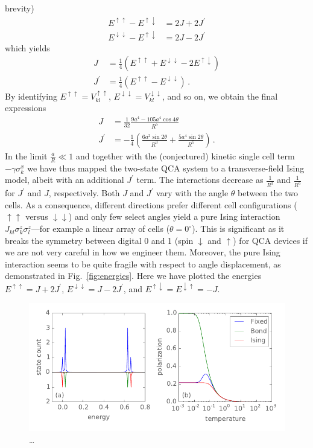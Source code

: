brevity)
%
\begin{align}
  E^{\uparrow\uparrow} - E^{\uparrow\downarrow} &= 2J + 2J^{\prime} \\
  E^{\downarrow\downarrow} - E^{\uparrow\downarrow} &= 2J - 2J^{\prime}
\end{align}
%
which yields
%
\begin{align}
  J &= \frac{1}{4} 
  \left( 
    E^{\uparrow\uparrow} + E^{\downarrow\downarrow} - 2 E^{\uparrow\downarrow} 
  \right) \\
  J^{\prime} &= \frac{1}{4}
  \left( E^{\uparrow\uparrow} - E^{\downarrow\downarrow} \right) \, .
\end{align}
%
By identifying $E^{\uparrow\uparrow} = V^{\uparrow\uparrow}_{kl}$,
$E^{\downarrow\downarrow} = V^{\downarrow\downarrow}_{kl}$, and so on, we obtain
the final expressions
% 
\begin{align}
  J 
  &=
  \frac{1}{32}
  \frac{9 a^4 - 105 a^4 \cos{4\theta}}{R^5} \\
  J^{\prime}
  &=
  - \frac{1}{4}
  \left(
    \frac{6 a^2 \sin{2\theta}}{R^3} + \frac{5 a^4 \sin{2\theta}}{R^5}
  \right) \, .
\end{align}
%
In the limit $\frac{a}{R} \ll 1$ and together with the (conjectured) kinetic
single cell term $-\gamma \sigma^x_k$ we have thus mapped the two-state QCA
system to a transverse-field Ising model, albeit with an additional $J^{\prime}$
term. The interactions decrease as $\frac{1}{R^3}$ and $\frac{1}{R^5}$ for
$J^{\prime}$ and $J$, respectively. Both $J$ and $J^{\prime}$ vary with the
angle $\theta$ between the two cells. As a consequence, different directions
prefer different cell configurations ($\uparrow\uparrow$ versus
$\downarrow\downarrow$) and only few select angles yield a pure Ising
interaction $J_{kl} \sigma^z_k \sigma^z_l$---for example a linear array of cells
($\theta = 0^{\circ}$). This is significant as it breaks the symmetry between
digital 0 and 1 (spin $\downarrow$ and $\uparrow$) for QCA devices if we are not
very careful in how we engineer them. Moreover, the pure Ising interaction seems
to be quite fragile with respect to angle displacement, as demonstrated in
Fig.~\ref{fig:energies}. Here we have plotted the energies $E^{\uparrow\uparrow}
= J + 2 J^{\prime}$, $E^{\downarrow\downarrow} = J - 2 J^{\prime}$, and
$E^{\uparrow\downarrow} = E^{\downarrow\uparrow} = - J$.

\begin{figure}
  \center
  \includegraphics{ising_approximation1}
  \caption{\ldots}
  \label{fig:ising_approximation1}
\end{figure}

